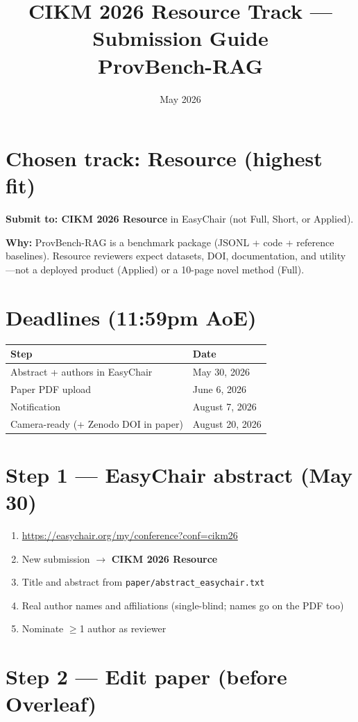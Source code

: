 \documentclass[11pt]{article}
\title{CIKM 2026 Resource Track --- Submission Guide\\ProvBench-RAG}
\author{}
\date{May 2026}
\begin{document}
\maketitle

\section{Chosen track: Resource (highest fit)}

\textbf{Submit to: CIKM 2026 Resource} in EasyChair (not Full, Short, or Applied).

\textbf{Why:} ProvBench-RAG is a benchmark package (JSONL + code + reference baselines). Resource reviewers expect datasets, DOI, documentation, and utility---not a deployed product (Applied) or a 10-page novel method (Full).

\section{Deadlines (11:59pm AoE)}

\begin{tabular}{ll}
\hline
Step & Date \\
\hline
Abstract + authors in EasyChair & May 30, 2026 \\
Paper PDF upload & June 6, 2026 \\
Notification & August 7, 2026 \\
Camera-ready (+ Zenodo DOI in paper) & August 20, 2026 \\
\hline
\end{tabular}

\section{Step 1 --- EasyChair abstract (May 30)}

\begin{enumerate}
\item \url{https://easychair.org/my/conference?conf=cikm26}
\item New submission $\rightarrow$ \textbf{CIKM 2026 Resource}
\item Title and abstract from \texttt{paper/abstract\_easychair.txt}
\item Real author names and affiliations (single-blind; names go on the PDF too)
\item Nominate $\geq$1 author as reviewer
\end{enumerate}

\section{Step 2 --- Edit paper (before Overleaf)}
\end{document}
